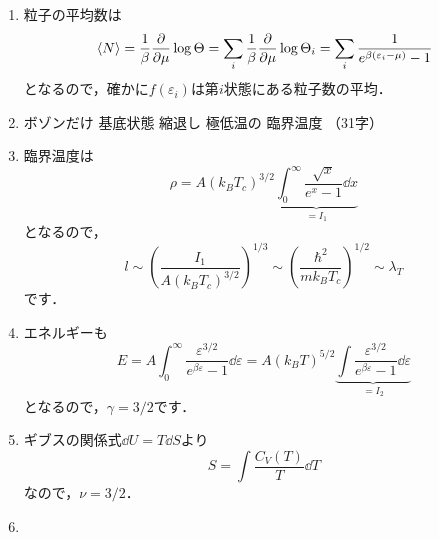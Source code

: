 \documentclass[a4paper,pdflatex,ja=standard]{bxjsarticle}
\begin{document}
\begin{enumerate}

  \item 

  粒子の平均数は
  \begin{equation}
    \ev*{N}
    =
    \frac{1}{\beta}\pdv{}{\mu}\log\Theta
    =
    \sum_{i}
    \frac{1}{\beta}\pdv{}{\mu}\log\Theta_i
    =
    \sum_{i}
    \frac{1}{e^{\beta(\varepsilon_i-\mu)}-1}
  \end{equation}
  となるので，確かに$f(\varepsilon_i)$は第$i$状態にある粒子数の平均．


  \item 

  ボゾンだけ
  \quad
  基底状態
  \quad
  縮退し
  \quad
  極低温の
  \quad
  臨界温度
  \quad
  （31字）


  \item 

  臨界温度は
  \begin{equation}
    \rho
    =
    A(k_BT_c)^{3/2}
    \underbrace{
      \int_{0}^{\infty}\frac{\sqrt{x}}{e^x-1}\dd x
    }_{=I_1}
  \end{equation}
  となるので，
  \begin{equation}
    l
    \sim  
    \left(  
      \frac{I_1}{A(k_BT_c)^{3/2}}
    \right)^{1/3}
    \sim
    \left( \frac{\hbar^2}{mk_BT_c} \right)^{1/2}
    \sim
    \lambda_T
  \end{equation}
  です．


  \item

  エネルギーも
  \begin{equation}
    E
    =
    A\int_{0}^{\infty}
    \frac{\varepsilon^{3/2}}{e^{\beta\varepsilon}-1}
    \dd \varepsilon
    =
    A(k_BT)^{5/2}
    \underbrace{
      \int
      \frac{\varepsilon^{3/2}}{e^{\beta\varepsilon}-1}
      \dd \varepsilon
    }_{=I_2}
  \end{equation}
  となるので，$\gamma=3/2$です．

  \item 

  ギブスの関係式$\dd U=T\dd S$より
  \begin{equation}
    S
    =
    \int
    \frac{C_V(T)}{T}
    \dd T
  \end{equation}
  なので，$\nu=3/2$．


  \item 


\end{enumerate}
\end{document}
